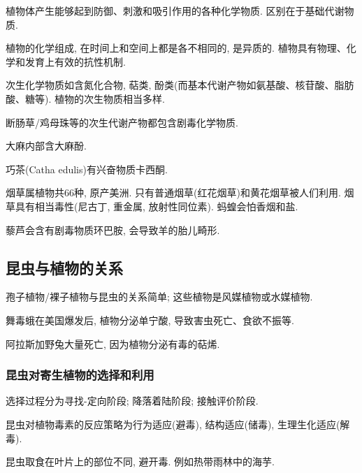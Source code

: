 \documentclass{ctexart}
\begin{document}
植物体产生能够起到防御、刺激和吸引作用的各种化学物质. 区别在于基础代谢物质.
\par
植物的化学组成, 在时间上和空间上都是各不相同的, 是异质的. 植物具有物理、化学和发育上有效的抗性机制.
\par
次生化学物质如含氮化合物, 萜类, 酚类(而基本代谢产物如氨基酸、核苷酸、脂肪酸、糖等). 植物的次生物质相当多样.

\begin{ex}
    断肠草/鸡母珠等的次生代谢产物都包含剧毒化学物质.
\end{ex}
\begin{ex}
    大麻内部含大麻酚.
\end{ex}
\begin{ex}
    巧茶(Catha edulis)有兴奋物质卡西酮.
\end{ex}
\begin{ex}
    烟草属植物共$66$种, 原产美洲. 只有普通烟草(红花烟草)和黄花烟草被人们利用. 烟草具有相当毒性(尼古丁, 重金属, 放射性同位素). 蚂蝗会怕香烟和盐.
\end{ex}
\begin{ex}
    藜芦会含有剧毒物质环巴胺, 会导致羊的胎儿畸形.
\end{ex}



\subsection{昆虫与植物的关系} %
\label{sub:昆虫与植物的关系}

孢子植物/裸子植物与昆虫的关系简单; 这些植物是风媒植物或水媒植物.

\begin{ex}
    舞毒蛾在美国爆发后, 植物分泌单宁酸, 导致害虫死亡、食欲不振等.
\end{ex}
\begin{ex}
    阿拉斯加野兔大量死亡, 因为植物分泌有毒的萜烯.
\end{ex}

\subsubsection{昆虫对寄生植物的选择和利用} %
\label{ssub:昆虫对寄生植物的选择和利用}

\begin{cenum}
    \item 选择过程分为寻找-定向阶段; 降落着陆阶段; 接触评价阶段.
    \item 昆虫对植物毒素的反应策略为行为适应(避毒), 结构适应(储毒), 生理生化适应(解毒).
\end{cenum}
\begin{ex}
    昆虫取食在叶片上的部位不同, 避开毒. 例如热带雨林中的海芋.
\end{ex}
\end{document}
